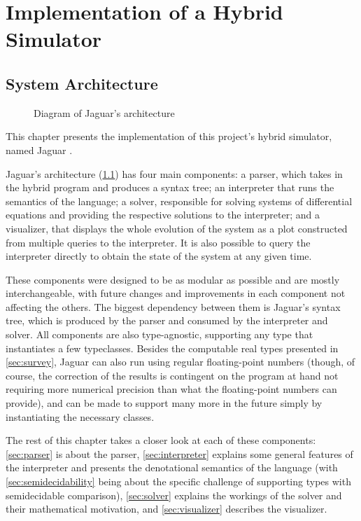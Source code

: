 \chapter{Implementation of a Hybrid Simulator}
\label{chap:implementation}

\section{System Architecture}
\label{sec:architecture}

\begin{figure}
  \centering
  
  \caption{Diagram of Jaguar's architecture}
  \label{fig:architecture}
\end{figure}

This chapter presents the implementation of this project's hybrid simulator, named Jaguar \cite{Jaguar}.

Jaguar's architecture (\cref{fig:architecture}) has four main components: a parser, which takes in the hybrid program and produces a syntax tree; an interpreter that runs the semantics of the language; a solver, responsible for solving systems of differential equations and providing the respective solutions to the interpreter; and a visualizer, that displays the whole evolution of the system as a plot constructed from multiple queries to the interpreter. It is also possible to query the interpreter directly to obtain the state of the system at any given time.

These components were designed to be as modular as possible and are mostly interchangeable, with future changes and improvements in each component not affecting the others. The biggest dependency between them is Jaguar's syntax tree, which is produced by the parser and consumed by the interpreter and solver. All components are also type-agnostic, supporting any type that instantiates a few typeclasses. Besides the computable real types presented in \cref{sec:survey}, Jaguar can also run using regular floating-point numbers (though, of course, the correction of the results is contingent on the program at hand not requiring more numerical precision than what the floating-point numbers can provide), and can be made to support many more in the future simply by instantiating the necessary classes.

The rest of this chapter takes a closer look at each of these components: \cref{sec:parser} is about the parser, \cref{sec:interpreter} explains some general features of the interpreter and presents the denotational semantics of the language (with \cref{sec:semidecidability} being about the specific challenge of supporting types with semidecidable comparison), \cref{sec:solver} explains the workings of the solver and their mathematical motivation, and \cref{sec:visualizer} describes the visualizer.


